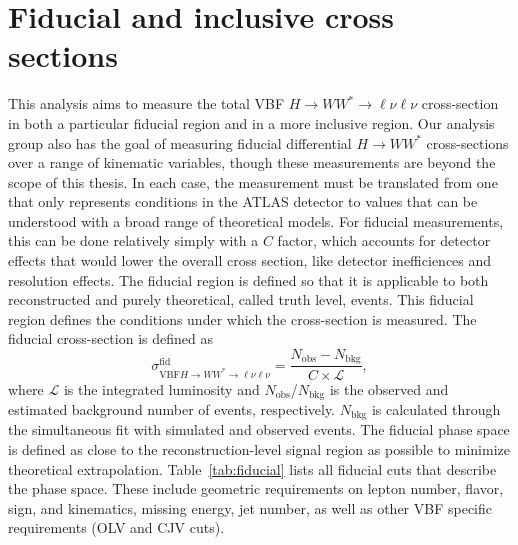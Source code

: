 \section{Fiducial and inclusive cross sections}
This analysis aims to measure the total VBF $H\rightarrow WW^*\rightarrow\ell\nu\ell\nu$ cross-section in both a particular fiducial region and in a more inclusive region. Our analysis group also has the goal of measuring fiducial differential $H\rightarrow WW^*$ cross-sections over a range of kinematic variables, though these measurements are beyond the scope of this thesis. In each case, the measurement must be translated from one that only represents conditions in the ATLAS detector to values that can be understood with a broad range of theoretical models. For fiducial measurements, this can be done relatively simply with a $C$ factor, which accounts for  detector effects that would lower the overall cross section, like detector inefficiences and resolution effects. The fiducial region is defined so that it is applicable to both reconstructed and purely theoretical, called truth level, events. This fiducial region defines the conditions under which the cross-section is measured. The fiducial cross-section is defined as
\begin{equation}
\sigma_{\text{VBF}H\rightarrow WW^*\rightarrow\ell\nu\ell\nu}^{\text{fid}} = \frac{N_{\text{obs}}-N_{\text{bkg}}}{C\times\mathcal{L}},
\end{equation} 
where $\mathcal{L}$ is the integrated luminosity and $N_{\text{obs}}$/$N_{\text{bkg}}$ is the observed and estimated background number of events, respectively. $N_{\text{bkg}}$ is calculated through the simultaneous fit with simulated and observed events. The fiducial phase space is defined as close to the reconstruction-level signal region as possible to minimize theoretical extrapolation. Table~\ref{tab:fiducial} lists all fiducial cuts that describe the phase space. These include geometric requirements on lepton number, flavor, sign, and kinematics, missing energy, jet number, as well as other VBF specific requirements (OLV and CJV cuts). 
